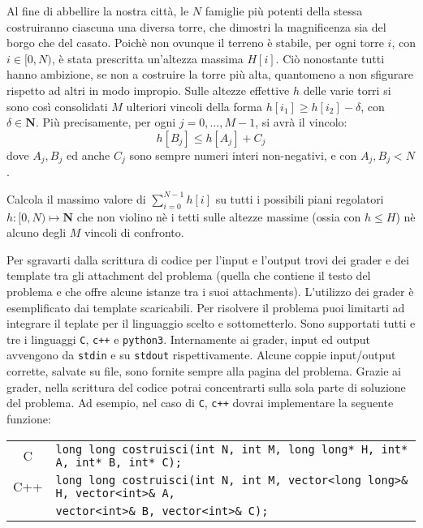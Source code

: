 \renewcommand{\nomebreve}{without\_grader}

Al fine di abbellire la nostra città, le $N$ famiglie più potenti della stessa costruiranno ciascuna una diversa torre, che dimostri la magnificenza sia del borgo che del casato. Poichè non ovunque il terreno è stabile, per ogni torre $i$, con $i\in [0,N)$, è stata prescritta un'altezza massima $H[i]$. Ciò nonostante tutti hanno ambizione, se non a costruire la torre più alta, quantomeno a non sfigurare rispetto ad altri in modo impropio.
Sulle altezze effettive $h$ delle varie torri si sono così consolidati $M$ ulteriori vincoli della forma $h[i_1] \geq h[i_2] - \delta$, con $\delta \in  \mathbf{N}$. Più precisamente, per ogni $j=0,\ldots,M-1$, si avrà il vincolo:
\[
   h[B_j] \leq h[A_j] + C_j 
\]
dove $A_j, B_j$ ed anche $C_j$ sono sempre numeri interi non-negativi, e con $A_j, B_j < N$.

Calcola il massimo valore di $\sum_{i=0}^{N-1} h[i]$ su tutti i possibili piani regolatori $h:[0,N)\mapsto \mathbf{N}$ che non violino nè i tetti sulle altezze massime (ossia con $h\leq H$)  nè alcuno degli $M$ vincoli di confronto. 



Per sgravarti dalla scrittura di codice per l'input e l'output trovi dei grader e dei template tra gli attachment del problema (quella che contiene il testo del problema e che offre alcune istanze tra i suoi attachments). L'utilizzo dei grader è esemplificato dai template scaricabili. Per risolvere il problema puoi limitarti ad integrare il teplate per il linguaggio scelto e sottometterlo. Sono supportati tutti e tre i linguaggi \verb'C', \verb'c++' e \verb'python3'.
Internamente ai grader, input ed output avvengono da \verb'stdin' e su \verb'stdout' rispettivamente. Alcune coppie input/output corrette, salvate su file, sono fornite sempre alla pagina del problema.
Grazie ai grader, nella scrittura del codice potrai concentrarti sulla sola parte di soluzione del problema. Ad esempio, nel caso di \verb'C', \verb'c++' dovrai implementare la seguente funzione:

\begin{center}\begin{tabularx}{\textwidth}{|c|X|}
\hline
C  & \verb|long long costruisci(int N, int M, long long* H, int* A, int* B, int* C);|\\
C++ & \verb|long long costruisci(int N, int M, vector<long long>& H, vector<int>& A,|\\
& \hspace{4.25cm}\verb|vector<int>& B, vector<int>& C);|\\
\hline
\end{tabularx}\end{center}


